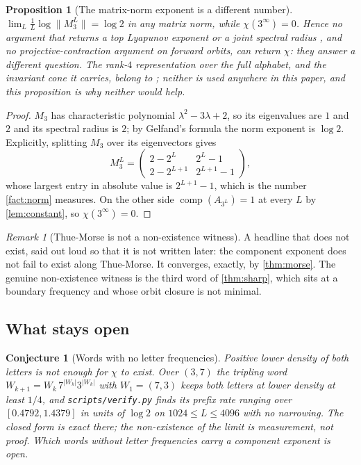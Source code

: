 \documentclass[11pt]{amsart}
\newtheorem{proposition}[theorem]{Proposition}
\newtheorem{conjecture}[theorem]{Conjecture}
\theoremstyle{definition}
\theoremstyle{remark}
\newtheorem{remark}[theorem]{Remark}
\newcommand{\vpy}{\texttt{scripts/\allowbreak verify.py}}
\DeclareMathOperator{\comp}{comp}
\begin{document}
\begin{proposition}[The matrix-norm exponent is a different number]
\label{prop:norm}
$\lim_L \tfrac1L \log \lVert M_3^L \rVert = \log 2$ in any matrix norm, while $\chi(3^\infty) = 0$. Hence no argument that returns a top Lyapunov exponent \cite{furstenbergkesten} or a joint spectral radius \cite{jungers}, and no projective-contraction argument on forward orbits, can return $\chi$: they answer a different question. The rank-$4$ representation over the full alphabet, and the invariant cone it carries, belong to \cite{ordersensitivity}; neither is used anywhere in this paper, and this proposition is why neither would help.
\end{proposition}

\begin{proof}
$M_3$ has characteristic polynomial $\lambda^2 - 3\lambda + 2$, so its eigenvalues are $1$ and $2$ and its spectral radius is $2$; by Gelfand's formula the norm exponent is $\log 2$. Explicitly, splitting $M_3$ over its eigenvectors gives
\[
M_3^L = \begin{pmatrix} 2 - 2^L & 2^L - 1 \\ 2 - 2^{L+1} & 2^{L+1} - 1\end{pmatrix},
\]
whose largest entry in absolute value is $2^{L+1}-1$, which is the number \cref{fact:norm} measures. On the other side $\comp(A_{3^L}) = 1$ at every $L$ by \cref{lem:constant}, so $\chi(3^\infty) = 0$.
\end{proof}

\begin{remark}[Thue-Morse is not a non-existence witness]
\label{rem:notmorse}
A headline that does not exist, said out loud so that it is not written later: the component exponent does not fail to exist along Thue-Morse. It converges, exactly, by \cref{thm:morse}. The genuine non-existence witness is the third word of \cref{thm:sharp}, which sits at a boundary frequency and whose orbit closure is not minimal.
\end{remark}

\subsection{What stays open}

\begin{conjecture}[Words with no letter frequencies]
\label{con:nofreq}
Positive lower density of both letters is not enough for $\chi$ to exist. Over $(3,7)$ the tripling word $W_{k+1} = W_k \, 7^{|W_k|} 3^{|W_k|}$ with $W_1 = (7,3)$ keeps both letters at lower density at least $1/4$, and \vpy{} finds its prefix rate ranging over $[0.4792, 1.4379]$ in units of $\log 2$ on $1024 \le L \le 4096$ with no narrowing. The closed form is exact there; the non-existence of the limit is measurement, not proof. Which words without letter frequencies carry a component exponent is open.
\end{conjecture}
\end{document}

